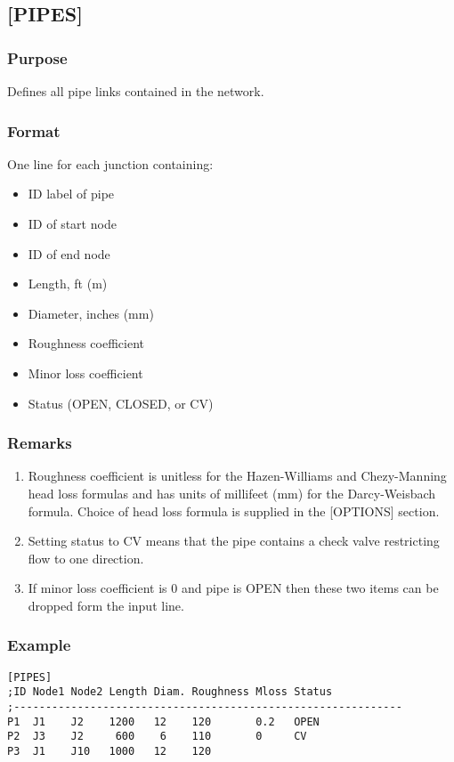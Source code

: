 \subsection{[PIPES]}
  \subsubsection{Purpose}
  Defines all pipe links contained in the network.
  \subsubsection{Format}
  One line for each junction containing:
  \begin{itemize}
    \item ID label of pipe
    \item ID of start node
    \item ID of end node
    \item Length, ft (m)
    \item Diameter, inches (mm)
    \item Roughness coefficient
    \item Minor loss coefficient
    \item Status (OPEN, CLOSED, or CV)
  \end{itemize}
  \subsubsection{Remarks}
  \begin{enumerate}
    \item Roughness coefficient is unitless for the Hazen-Williams and Chezy-Manning 
          head loss formulas and has units of millifeet (mm) for the Darcy-Weisbach 
	  formula. Choice of head loss formula is supplied in the [OPTIONS] section.
    \item Setting status to CV means that the pipe contains a check valve restricting
          flow to one direction.
    \item If minor loss coefficient is 0 and pipe is OPEN then these two items can
          be dropped form the input line.
  \end{enumerate}
  \subsubsection{Example}
\begin{verbatim}[PIPES]
;ID Node1 Node2 Length Diam. Roughness Mloss Status
;-------------------------------------------------------------
P1  J1    J2    1200   12    120       0.2   OPEN
P2  J3    J2     600    6    110       0     CV
P3  J1    J10   1000   12    120
\end{verbatim}

